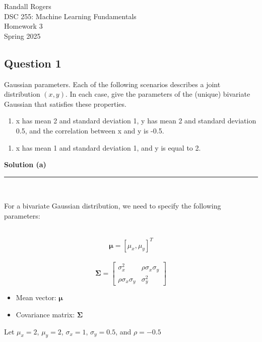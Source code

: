 \documentclass{article}
\begin{document}
\begin{flushright}
   Randall Rogers\\
   DSC 255: Machine Learning Fundamentals\\
   Homework 3 \\
   Spring 2025 \\
\end{flushright}

\subsection*{Question 1}
\parbox{\textwidth}{Gaussian parameters. Each of the following scenarios describes a joint distribution $(x, y)$. In each case, give the parameters of the (unique) bivariate Gaussian that satisfies these properties.}

\begin{enumerate}[label=(a)]
    \item x has mean 2 and standard deviation 1, y has mean 2 and standard deviation 0.5, and the
correlation between x and y is -0.5.
\end{enumerate}
\begin{enumerate}[label=(b)]
    \item x has mean 1 and standard deviation 1, and y is equal to 2.
\end{enumerate}

\parbox{\textwidth}{\textbf{Solution (a)}}

\noindent\rule{\textwidth}{0.4pt}\\
\parbox{\textwidth}{For a bivariate Gaussian distribution, we need to specify the following parameters:}\\

$$\boldsymbol{\mu} = [\mu_x, \mu_y]^T$$\\
$$\boldsymbol{\Sigma} = \begin{bmatrix} \sigma_x^2 & \rho\sigma_x\sigma_y \\ \rho\sigma_x\sigma_y & \sigma_y^2 \end{bmatrix}$$

\begin{itemize}
    \item Mean vector: $\boldsymbol{\mu}$
    \item Covariance matrix: $\boldsymbol{\Sigma}$
\end{itemize}

\parbox{\textwidth}{Let $\mu_x = 2$, $\mu_y = 2$, $\sigma_x = 1$, $\sigma_y = 0.5$, and $\rho = -0.5$}\\
\end{document}
